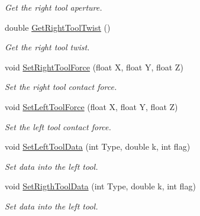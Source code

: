 \begin{DoxyCompactItemize}
\begin{DoxyCompactList}\small\item\em Get the right tool aperture. \item\end{DoxyCompactList}\item 
\hypertarget{classvtkLSW_a76e845f3dadc24937aa30f8dd20a4a5a}{
double \hyperlink{classvtkLSW_a76e845f3dadc24937aa30f8dd20a4a5a}{GetRightToolTwist} ()}
\label{classvtkLSW_a76e845f3dadc24937aa30f8dd20a4a5a}

\begin{DoxyCompactList}\small\item\em Get the right tool twist. \item\end{DoxyCompactList}\item 
\hypertarget{classvtkLSW_a737826471233bb757441dd09c6fc1469}{
void \hyperlink{classvtkLSW_a737826471233bb757441dd09c6fc1469}{SetRightToolForce} (float X, float Y, float Z)}
\label{classvtkLSW_a737826471233bb757441dd09c6fc1469}

\begin{DoxyCompactList}\small\item\em Set the right tool contact force. \item\end{DoxyCompactList}\item 
\hypertarget{classvtkLSW_af67b7c7d9118380eec8aed8235de4a64}{
void \hyperlink{classvtkLSW_af67b7c7d9118380eec8aed8235de4a64}{SetLeftToolForce} (float X, float Y, float Z)}
\label{classvtkLSW_af67b7c7d9118380eec8aed8235de4a64}

\begin{DoxyCompactList}\small\item\em Set the left tool contact force. \item\end{DoxyCompactList}\item 
\hypertarget{classvtkLSW_ae761b6cf47566ba99acfff3c1b3df39f}{
void \hyperlink{classvtkLSW_ae761b6cf47566ba99acfff3c1b3df39f}{SetLeftToolData} (int Type, double k, int flag)}
\label{classvtkLSW_ae761b6cf47566ba99acfff3c1b3df39f}

\begin{DoxyCompactList}\small\item\em Set data into the left tool. \item\end{DoxyCompactList}\item 
\hypertarget{classvtkLSW_af59e34299d384676e30425d76bdf8a87}{
void \hyperlink{classvtkLSW_af59e34299d384676e30425d76bdf8a87}{SetRigthToolData} (int Type, double k, int flag)}
\label{classvtkLSW_af59e34299d384676e30425d76bdf8a87}

\begin{DoxyCompactList}\small\item\em Set data into the left tool. \item\end{DoxyCompactList}\end{DoxyCompactItemize}
